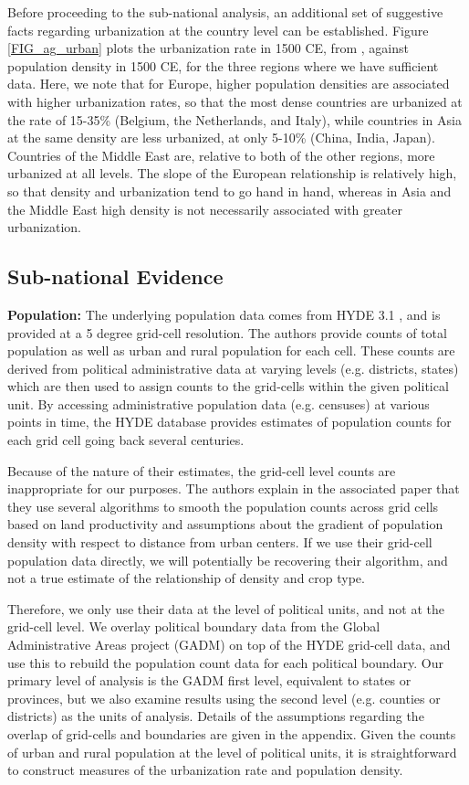 \documentclass[10pt]{article}
\begin{document}
Before proceeding to the sub-national analysis, an additional set of suggestive facts regarding urbanization at the country level can be established. Figure \ref{FIG_ag_urban} plots the urbanization rate in 1500 CE, from \citet{ccp14}, against population density in 1500 CE, for the three regions where we have sufficient data. Here, we note that for Europe, higher population densities are associated with higher urbanization rates, so that the most dense countries are urbanized at the rate of 15-35\% (Belgium, the Netherlands, and Italy), while countries in Asia at the same density are less urbanized, at only 5-10\% (China, India, Japan). Countries of the Middle East are, relative to both of the other regions, more urbanized at all levels. The slope of the European relationship is relatively high, so that density and urbanization tend to go hand in hand, whereas in Asia and the Middle East high density is not necessarily associated with greater urbanization.


\subsection{Sub-national Evidence}


\textbf{Population:} The underlying population data comes from HYDE 3.1 \citep{hyde31}, and is provided at a 5 degree grid-cell resolution. The authors provide counts of total population as well as urban and rural population for each cell. These counts are derived from political administrative data at varying levels (e.g. districts, states) which are then used to assign counts to the grid-cells within the given political unit. By accessing administrative population data (e.g. censuses) at various points in time, the HYDE database provides estimates of population counts for each grid cell going back several centuries.

Because of the nature of their estimates, the grid-cell level counts are inappropriate for our purposes. The authors explain in the associated paper that they use several algorithms to smooth the population counts across grid cells based on land productivity and assumptions about the gradient of population density with respect to distance from urban centers. If we use their grid-cell population data directly, we will potentially be recovering their algorithm, and not a true estimate of the relationship of density and crop type.

Therefore, we only use their data at the level of political units, and not at the grid-cell level. We overlay political boundary data from the Global Administrative Areas project (GADM) on top of the HYDE grid-cell data, and use this to rebuild the population count data for each political boundary. Our primary level of analysis is the GADM first level, equivalent to states or provinces, but we also examine results using the second level (e.g. counties or districts) as the units of analysis. Details of the assumptions regarding the overlap of grid-cells and boundaries are given in the appendix. Given the counts of urban and rural population at the level of political units, it is straightforward to construct measures of the urbanization rate and population density. 
\end{document}
